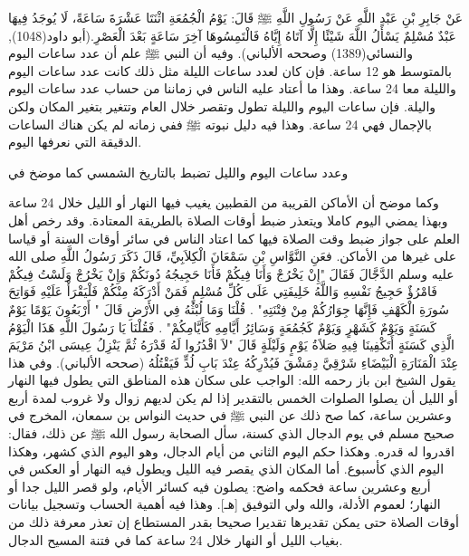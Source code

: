 عَنْ جَابِرِ بْنِ عَبْدِ اللَّهِ عَنْ رَسُولِ اللَّهِ ﷺ قَالَ: يَوْمُ الْجُمُعَةِ اثْنَتَا عَشْرَةَ سَاعَةً، لَا يُوجَدُ فِيهَا عَبْدٌ مُسْلِمٌ يَسْأَلُ اللَّهَ شَيْئًا إِلَّا آتَاهُ إِيَّاهُ فَالْتَمِسُوهَا آخِرَ سَاعَةٍ بَعْدَ الْعَصْرِ.{\footnotesize (أبو داود(1048), والنسائي(1389) وصححه الألباني)}. وفيه أن النبي ﷺ علم أن عدد ساعات اليوم بالمتوسط هو 12 ساعة. فإن كان لعدد ساعات الليلة مثل ذلك كانت عدد ساعات اليوم والليلة معا 24 ساعة. وهذا ما أعتاد عليه الناس في زماننا من حساب عدد ساعات اليوم واليلة. فإن ساعات اليوم والليلة تطول وتقصر خلال العام وتتغير بتغير المكان ولكن بالإجمال فهي 24 ساعة. وهذا فيه دليل نبوته ﷺ ففي زمانه لم يكن هناك الساعات الدقيقة التي نعرفها اليوم.

وعدد ساعات اليوم والليل تضبط بالتاريخ الشمسي كما موضخ في %


وكما موضح أن الأماكن القريبة من القطبين يغيب فيها النهار أو الليل خلال 24 ساعة وبهذا يمضي اليوم كاملا ويتعذر ضبط أوقات الصلاة بالطريقة المعتادة. وقد رخص أهل العلم على جواز ضبط وقت الصلاة فيها كما اعتاد الناس في سائر أوقات السنة أو قياسا على غيرها من الأماكن. فعَنِ النَّوَّاسِ بْنِ سَمْعَانَ الْكِلاَبِيِّ، قَالَ ذَكَرَ رَسُولُ اللَّهِ صلى الله عليه وسلم الدَّجَّالَ فَقَالَ "إِنْ يَخْرُجْ وَأَنَا فِيكُمْ فَأَنَا حَجِيجُهُ دُونَكُمْ وَإِنْ يَخْرُجْ وَلَسْتُ فِيكُمْ فَامْرُؤٌ حَجِيجُ نَفْسِهِ وَاللَّهُ خَلِيفَتِي عَلَى كُلِّ مُسْلِمٍ فَمَنْ أَدْرَكَهُ مِنْكُمْ فَلْيَقْرَأْ عَلَيْهِ فَوَاتِحَ سُورَةِ الْكَهْفِ فَإِنَّهَا جِوَارُكُمْ مِنْ فِتْنَتِهِ" . قُلْنَا وَمَا لُبْثُهُ فِي الأَرْضِ قَالَ " أَرْبَعُونَ يَوْمًا يَوْمٌ كَسَنَةٍ وَيَوْمٌ كَشَهْرٍ وَيَوْمٌ كَجُمُعَةٍ وَسَائِرُ أَيَّامِهِ كَأَيَّامِكُمْ" . فَقُلْنَا يَا رَسُولَ اللَّهِ هَذَا الْيَوْمُ الَّذِي كَسَنَةٍ أَتَكْفِينَا فِيهِ صَلاَةُ يَوْمٍ وَلَيْلَةٍ قَالَ "لاَ اقْدُرُوا لَهُ قَدْرَهُ ثُمَّ يَنْزِلُ عِيسَى ابْنُ مَرْيَمَ عِنْدَ الْمَنَارَةِ الْبَيْضَاءِ شَرْقِيَّ دِمَشْقَ فَيُدْرِكُهُ عِنْدَ بَابِ لُدٍّ فَيَقْتُلُهُ {\footnotesize (صححه الألباني)}.
وفي هذا يقول الشيخ ابن باز رحمه الله:
الواجب على سكان هذه المناطق التي يطول فيها النهار أو الليل أن يصلوا الصلوات الخمس بالتقدير إذا لم يكن لديهم زوال ولا غروب لمدة أربع وعشرين ساعة، كما صح ذلك عن النبي ﷺ في حديث النواس بن سمعان، المخرج في صحيح مسلم في يوم الدجال الذي كسنة، سأل الصحابة رسول الله ﷺ عن ذلك، فقال: اقدروا له قدره. وهكذا حكم اليوم الثاني من أيام الدجال، وهو اليوم الذي كشهر، وهكذا اليوم الذي كأسبوع. أما المكان الذي يقصر فيه الليل ويطول فيه النهار أو العكس في أربع وعشرين ساعة فحكمه واضح: يصلون فيه كسائر الأيام، ولو قصر الليل جدا أو النهار؛ لعموم الأدلة، والله ولي التوفيق [هـ]. وهذا فيه أهمية الحساب وتسجيل بيانات أوقات الصلاة حتى يمكن تقديرها تقديرا صحيحا بقدر المستطاع إن تعذر معرفة ذلك من بغياب الليل أو النهار خلال 24 ساعة كما في فتنة المسيح الدجال.

